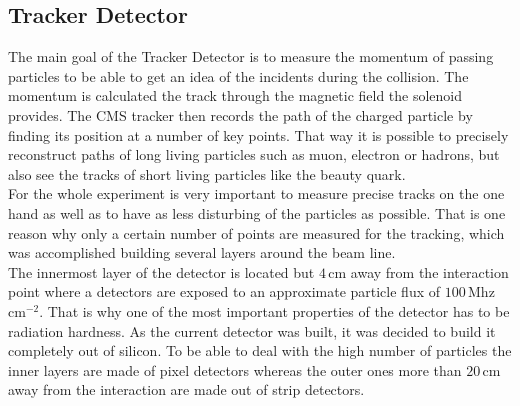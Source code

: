 \subsection{Tracker Detector}
The main goal of the Tracker Detector is to measure the momentum of passing particles to be able to get an idea of the incidents during the collision. The momentum is calculated the track through the magnetic field the solenoid provides. The \ac{CMS} tracker then records the path of the charged particle by finding its position at a number of key points. That way it is possible to precisely reconstruct paths of long living particles such as muon, electron or hadrons, but also see the tracks of short living particles like the beauty quark.\\
For the whole experiment is very important to measure precise tracks on the one hand as well as to have as less disturbing of the particles as possible. That is one reason why only a certain number of points are measured for the tracking, which was accomplished building several layers around the beam line.\\
The innermost layer of the detector is located but $4\,$cm away from the interaction point where a detectors are exposed to an approximate particle flux of $100\,$Mhz\,cm$^{-2}$. That is why one of the most important properties of the detector has to be radiation hardness. As the current detector was built, it was decided to build it completely out of silicon. To be able to deal with the high number of particles the inner layers are made of pixel detectors whereas the outer ones more than $20\,$cm away from the interaction are made out of strip detectors.
